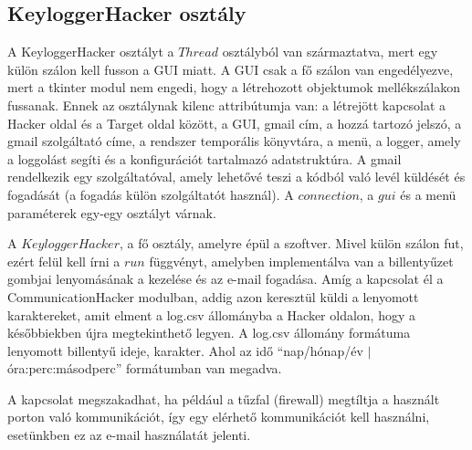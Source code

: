 \documentclass[12pt,a4paper,oneside]{report}
\begin{document}
\subsection{KeyloggerHacker osztály}\label{subsubsec:keyloggerclass}
A KeyloggerHacker osztályt a $Thread$ osztályból van származtatva, mert egy külön szálon kell fusson a GUI miatt. A GUI csak a fő szálon van engedélyezve, mert a tkinter modul nem engedi, hogy a létrehozott objektumok mellékszálakon fussanak. Ennek az osztálynak kilenc attribútumja van: a létrejött kapcsolat a Hacker oldal és a Target oldal között, a GUI, gmail cím, a hozzá tartozó jelszó, a gmail szolgáltató címe, a rendszer temporális könyvtára, a menü, a logger, amely a loggolást segíti és a konfigurációt tartalmazó adatstruktúra. A gmail rendelkezik egy szolgáltatóval, amely lehetővé teszi a kódból való levél küldését és fogadását (a fogadás külön szolgáltatót használ). A $connection$, a $gui$ és a menü paraméterek egy-egy osztályt várnak.

A $KeyloggerHacker$, a fő osztály, amelyre épül a szoftver. Mivel külön szálon fut, ezért felül kell írni a $run$ függvényt, amelyben implementálva van a billentyűzet gombjai lenyomásának a kezelése és az e-mail fogadása. Amíg a kapcsolat él a CommunicationHacker modulban, addig azon keresztül küldi a lenyomott karaktereket, amit elment a log.csv állományba a Hacker oldalon, hogy a későbbiekben újra megtekinthető legyen. A log.csv állomány formátuma lenyomott billentyű ideje, karakter. Ahol az idő ``nap/hónap/év $|$ óra:perc:másodperc'' formátumban van megadva.

A kapcsolat megszakadhat, ha például a tűzfal (firewall) megtíltja a használt porton való kommunikációt, így egy elérhető kommunikációt kell használni, esetünkben ez az e-mail használatát jelenti.
\end{document}
